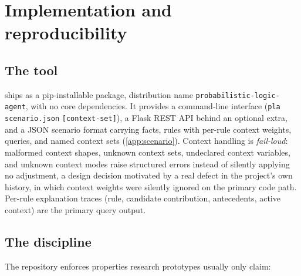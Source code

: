 \section{Implementation and reproducibility}\label{sec:implementation}

\subsection{The tool}

\pla{} ships as a pip-installable package, distribution name
\texttt{probabilistic-}\allowbreak\texttt{logic-}\allowbreak\texttt{agent}, with no core dependencies. It
provides a command-line interface
(\texttt{pla} \texttt{scenario.json} \texttt{[context-set]}), a Flask
REST API behind an
optional extra, and a JSON scenario format carrying facts, rules with
per-rule context weights, queries, and named context sets
(\ref{app:scenario}). Context handling is \emph{fail-loud}:
malformed context shapes, unknown context sets, undeclared context
variables, and unknown context modes raise structured errors instead of
silently applying no adjustment, a design decision motivated by a
real defect in the project's own history, in which context weights were
silently ignored on the primary code path. Per-rule explanation traces
(rule, candidate contribution, antecedents, active context) are the
primary query output.

\subsection{The discipline}

The repository enforces properties research prototypes usually only
claim:

